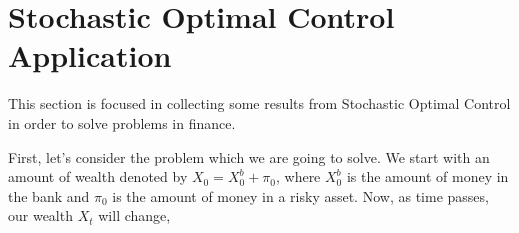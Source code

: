 \section{Stochastic Optimal Control Application}

This section is focused in collecting some results from Stochastic Optimal
Control in order to solve problems in finance.

First, let's consider the problem which we are going to solve.
We start with an amount of wealth denoted by $X_0 = X_0^b + \pi_0$,
where $X_0^b$ is the amount of money in the bank and $\pi_0$ is the amount
of money in a risky asset. Now, as time passes, our wealth $X_t$ will change,


